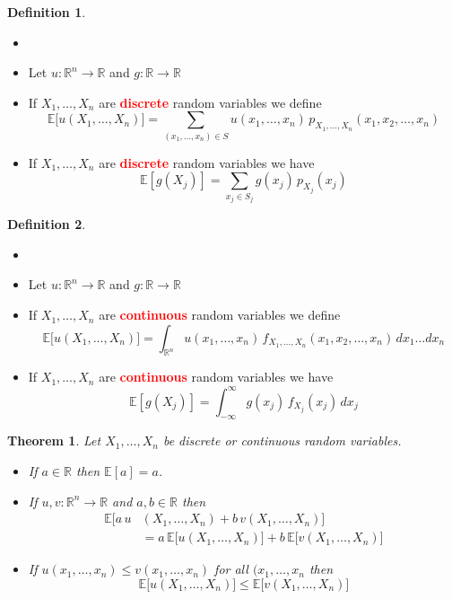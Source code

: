 \documentclass{article}
\newcommand{\R}{\mathbb{R}}
\newcommand{\E}{\mathbb{E}}
\newcommand{\bfred}[1]{\textcolor{red}{\textbf{#1}}}
\theoremstyle{plain}
\newtheorem{thm}{Theorem}[section]
\theoremstyle{definition}
\newtheorem{defn}{Definition}[section]
\theoremstyle{remark}
\begin{document}
\begin{defn}
    \begin{itemize}
        \item []
        \item Let $u:\R^n\rightarrow\R$ and $g:\R\rightarrow\R$
        \item If $X_1,\dotsc,X_n$ are \bfred{discrete} random variables we define \[\E\bigr[u(X_1,\dotsc,X_n)\bigr] = \sum_{(x_1,\dotsc,x_n)\in S}u(x_1,\dotsc, x_n)\,p_{X_1,\dotsc, X_n}(x_1,x_2,\dotsc,x_n)\]
        \item If $X_1,\dotsc,X_n$ are \bfred{discrete} random variables we have \[\E[g(X_j)]=\sum_{x_j\in S_j}g(x_j)\,p_{X_j}(x_j)\]
    \end{itemize}
\end{defn}

\begin{defn}
    \begin{itemize}
        \item []
        \item Let $u:\R^n\rightarrow\R$ and $g:\R\rightarrow\R$
        \item If $X_1,\dotsc,X_n$ are \bfred{continuous} random variables we define \[\E\bigr[u(X_1,\dotsc,X_n)\bigr] = \int_{\R^n}u(x_1,\dotsc, x_n)\,f_{X_1,\dotsc, X_n}(x_1,x_2,\dotsc,x_n)\,dx_1\dotsc dx_n\]
        \item If $X_1,\dotsc,X_n$ are \bfred{continuous} random variables we have \[\E[g(X_j)]=\int_{-\infty}^{\infty}g(x_j)\,f_{X_j}(x_j)\,dx_j\]
    \end{itemize}
\end{defn}

\begin{thm}
    Let $X_1,\dotsc,X_n$ be discrete or continuous random variables.
    \begin{itemize}
        \item If $a\in\R$ then $\E[a]=a$.
        \item If $u,v:\R^n\rightarrow\R$ and $a,b\in\R$ then
        \begin{align*}
            \E\bigr[a\,u&(X_1,\dotsc,X_n)+b\,v(X_1,\dotsc,X_n)\bigr]\\
            &=a\,\E\bigr[u(X_1,\dotsc,X_n)\bigr]+b\,\E\bigr[v(X_1,\dotsc,X_n)\bigr]
        \end{align*}
        \item If $u(x_1,\dotsc,x_n)\leq v(x_1,\dotsc,x_n)$ for all $(x_1,\dotsc,x_n$ then \[\E\bigr[u(X_1,\dotsc,X_n)\bigr]\leq\E\bigr[v(X_1,\dotsc,X_n)\bigr]\]
    \end{itemize}
\end{thm}
\end{document}
